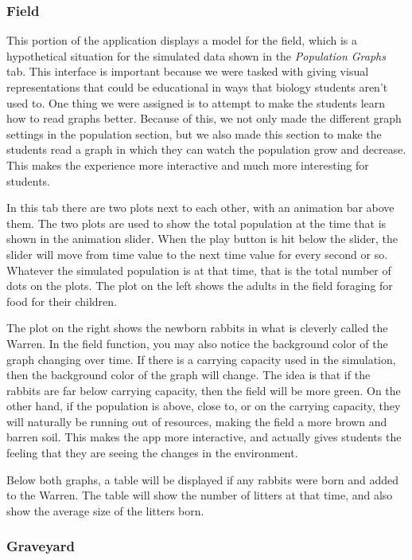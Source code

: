 \documentclass{article}\usepackage[]{graphicx}\usepackage[]{color}
\begin{document}
\subsubsection{Field}

This portion of the application displays a model for the field, which is a hypothetical situation for the simulated data shown in the \textit{Population Graphs} tab. This interface is important because we were tasked with giving visual representations that could be educational in ways that biology students aren't used to. One thing we were assigned is to attempt to make the students learn how to read graphs better. Because of this, we not only made the different graph settings in the population section, but we also made this section to make the students read a graph in which they can watch the population grow and decrease. This makes the experience more interactive and much more interesting for students.

In this tab there are two plots next to each other, with an animation bar above them. The two plots are used to show the total population at the time that is shown in the animation slider. When the play button is hit below the slider, the slider will move from time value to the next time value for every second or so. Whatever the simulated population is at that time, that is the total number of dots on the plots. The plot on the left shows the adults in the field foraging for food for their children. 

The plot on the right shows the newborn rabbits in what is cleverly called the Warren. In the field function, you may also notice the background color of the graph changing over time. If there is a carrying capacity used in the simulation, then the background color of the graph will change. The idea is that if the rabbits are far below carrying capacity, then the field will be more green. On the other hand, if the population is above, close to, or on the carrying capacity, they will naturally be running out of resources, making the field a more brown and barren soil. This makes the app more interactive, and actually gives students the feeling that they are seeing the changes in the environment. 

Below both graphs, a table will be displayed if any rabbits were born and added to the Warren. The table will show the number of litters at that time, and also show the average size of the litters born.


\subsubsection{Graveyard}
\end{document}
